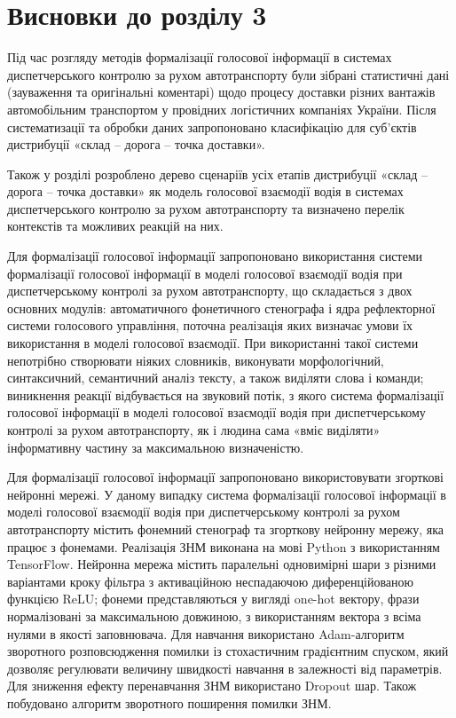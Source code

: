 \section*{Висновки до розділу 3}

Під час розгляду методів формалізації голосової інформації в системах диспетчерського контролю за рухом автотранспорту були зібрані статистичні дані (зауваження та оригінальні коментарі) щодо процесу доставки різних вантажів автомобільним транспортом у провідних логістичних компаніях України. Після систематизації та обробки даних запропоновано класифікацію для суб’єктів дистрибуції «склад – дорога – точка доставки».

Також у розділі розроблено дерево сценаріїв усіх етапів дистрибуції «склад – дорога – точка доставки» як модель голосової взаємодії водія в системах диспетчерського контролю за рухом автотранспорту та визначено перелік контекстів та можливих реакцій на них.

Для формалізації голосової інформації запропоновано використання системи формалізації голосової інформації в моделі голосової взаємодії водія при диспетчерському контролі за рухом автотранспорту, що складається з двох основних модулів: автоматичного фонетичного стенографа і ядра рефлекторної системи голосового управління, поточна реалізація яких визначає умови їх використання в моделі голосової взаємодії. При використанні такої системи непотрібно створювати ніяких словників, виконувати морфологічний, синтаксичний, семантичний аналіз тексту, а також виділяти слова і команди; виникнення реакції відбувається на звуковий потік, з якого система формалізації голосової інформації в моделі голосової взаємодії водія при диспетчерському контролі за рухом автотранспорту, як і людина сама «вміє виділяти» інформативну частину за максимальною визначеністю.

Для формалізації голосової інформації запропоновано використовувати згорткові нейронні мережі. У даному випадку система формалізації голосової інформації в моделі голосової взаємодії водія при диспетчерському контролі за рухом автотранспорту містить фонемний стенограф та згорткову нейронну мережу, яка працює з фонемами. Реалізація ЗНМ виконана на мові Python з використанням TensorFlow. Нейронна мережа містить паралельні одновимірні шари з різними варіантами кроку фільтра з активаційною неспадаючою диференційованою функцією ReLU; фонеми представляються у вигляді one-hot вектору, фрази нормалізовані за максимальною довжиною, з використанням вектора з всіма нулями в якості заповнювача. Для навчання використано Adam-алгоритм зворотного розповсюдження помилки із стохастичним градієнтним спуском, який дозволяє регулювати величину швидкості навчання в залежності від параметрів. Для зниження ефекту перенавчання ЗНМ використано Dropout шар. Також побудовано алгоритм зворотного поширення помилки ЗНМ.
 
